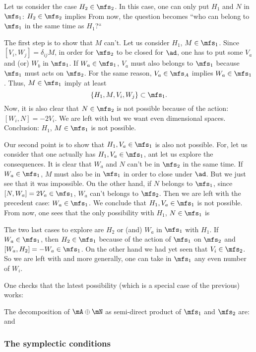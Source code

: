 Let us consider the case $H_2\in\mfs_2$. In this case, one can only put $H_1$ and $N$ in $\mfs_1$: $H_2\in\mfs_2$ implies
From now, the question becomes ``who can belong to $\mfs_1$ in the same time as $H_1$?``

The first step is to show that $M$ can't. Let us consider $H_1$, $M\in\mfs_1$. Since $[V_i,W_j]=\delta_{ij}M$, in order for $\mfs_2$ to be closed for $\ad$, one has to put some $V_a$ and (or) $W_b$ in $\mfs_1$. If $W_a\in\mfs_1$, $V_a$ must also belongs to $\mfs_1$ because $\mfs_1$ must acts on $\mfs_2$. For the same reason, $V_a\in\mfs_A$ implies $W_a\in\mfs_1$. Thus, $M\in\mfs_1$ imply at least
\[
	\{H_1,M,V_i,W_j\}\subset \mfs_1.
\]
Now, it is also clear that $N\in\mfs_2$ is not possible because of the action: $[W_i,N]=-2V_i$. We are left with
but we want even dimensional spaces. Conclusion: $H_1$, $M\in\mfs_1$ is not possible.

Our second point is to show that $H_1,V_a\in\mfs_1$ is also not possible. For, let us consider that one actually has $H_1,V_a\in\mfs_1$, ant let us explore the consequences. It is clear that $W_a$ and $N$ can't be in $\mfs_2$ in the same time. If $W_a\in\mfs_1$, $M$ must also be in $\mfs_1$ in order to close under $\ad$. But we just see that it was impossible. On the other hand, if $N$ belongs to $\mfs_1$, since $[N,W_a]=2V_a\in\mfs_1$, $W_a$ can't belongs to $\mfs_2$. Then we are left with the precedent case: $W_a\in\mfs_1$. We conclude that $H_1,V_a\in\mfs_1$ is not possible.
From now, one sees that the only possibility with $H_1$, $N\in\mfs_1$ is

The two last cases to explore are $H_2$ or (and)  $W_a$ in $\mfs_1$ with $H_1$. If $W_a\in\mfs_1$, then $H_2\in\mfs_1$ because of the action of $\mfs_1$ on $\mfs_2$ and $[W_a,H_2]=-W_a\in\mfs_1$. On the other hand we had yet seen that $V_i\in\mfs_2$. So we are left with
and more generally, one can take in $\mfs_1$ any even number of $W_i$.

One checks that the latest possibility (which is a special case of the previous) works:

The decomposition of $\mA\oplus\mN$ as semi-direct product of $\mfs_1$ and $\mfs_2$ are:
and


\subsubsection*{The symplectic conditions}

